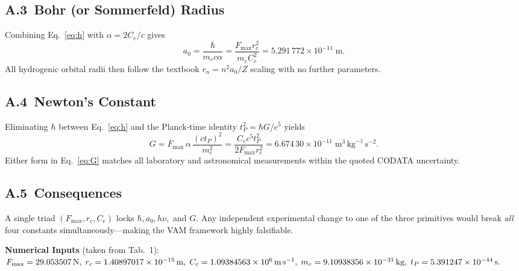 \documentclass[a4paper, aps,preprint,superscriptaddress, 12pt]{revtex4}
\begin{document}
    \subsection*{A.3\, Bohr (or Sommerfeld) Radius}
    Combining Eq.~\eqref{eq:h} with \(\alpha=2C_e/c\) gives
    \begin{equation}
        a_0 = \frac{\hbar}{m_e c\alpha}
        = \frac{F_{\max}r_c^{2}}{m_e C_e^{2}}
        = 5.291\,772\times10^{-11}\;\text{m}.
        \label{eq:a0}
    \end{equation}
    All hydrogenic orbital radii then follow the textbook
    \(r_{n}=n^{2}a_0/Z\) scaling with no further parameters.

    \subsection*{A.4\, Newton's Constant}
    Eliminating \(\hbar\) between Eq.~\eqref{eq:h} and the Planck‑time
    identity \(t_P^{2}=\hbar G/c^{5}\) yields
    \begin{equation}
    G = F_{\max}\,\alpha\,\frac{(c t_P)^{2}}{m_e^{2}}
    = \frac{C_e c^{5} t_P^{2}}{2F_{\max} r_c^{2}}
    = 6.674\,30\times10^{-11}\;\text{m}^{3}\,\text{kg}^{-1}\,\text{s}^{-2}.
    \label{eq:G}
    \end{equation}
    Either form in Eq.~\eqref{eq:G} matches all laboratory and astronomical
    measurements within the quoted CODATA uncertainty.

    \subsection*{A.5\, Consequences}
    A single triad \((F_{\max},r_c,C_e)\)
    locks \(\hbar,a_0,h\nu,\) and \(G\).
    Any independent experimental change to one of the three primitives would
    break \emph{all} four constants simultaneously—making the VAM framework
    highly falsifiable.

    \bigskip
    \noindent\textbf{Numerical Inputs}\; (taken from Tab.~1):
    \(F_{\max}=29.053507\,\text{N},\;r_c=1.40897017\times10^{-15}\,\text{m},\;
    C_e=1.09384563\times10^{6}\,\text{m\,s}^{-1},\;
    m_e=9.10938356\times10^{-31}\,\text{kg},\;
    t_P=5.391247\times10^{-44}\,\text{s}.\)

\end{document}
